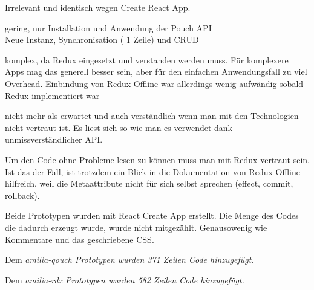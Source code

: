 
Irrelevant und identisch wegen Create React App.

%
\begin{description}[leftmargin=0.5cm,style=nextline]
  \item[amilia-qouch]
  gering, nur Installation und Anwendung der Pouch API\\
  Neue Instanz, Synchronisation ( 1 Zeile) und CRUD
  \item[amilia-rdx]
  komplex, da Redux eingesetzt und verstanden werden muss. Für komplexere Apps mag das generell besser sein, aber für den einfachen Anwendungsfall zu viel Overhead. Einbindung von Redux Offline war allerdings wenig aufwändig sobald Redux implementiert war
\end{description}
%
\begin{description}[leftmargin=0.5cm,style=nextline]
  \item[amilia-qouch]
  nicht mehr als erwartet und auch verständlich wenn man mit den Technologien nicht vertraut ist. Es liest sich so wie man es verwendet dank unmissverständlicher API.
  \item[amilia-rdx] 
  Um den Code ohne Probleme lesen zu können muss man mit Redux vertraut sein. Ist das der Fall, ist trotzdem ein Blick in die Dokumentation von Redux Offline hilfreich, weil die Metaattribute nicht für sich selbst sprechen (effect, commit, rollback).
\end{description}
%
  Beide Prototypen wurden mit React Create App erstellt. Die Menge des Codes die dadurch erzeugt wurde, wurde nicht mitgezählt. Genausowenig wie Kommentare und das geschriebene \gls{CSS}.
  \begin{description}[leftmargin=0.5cm,style=nextline]
    \item[amilia-qouch]
    Dem \it{amilia-qouch} Prototypen wurden 371 Zeilen Code hinzugefügt.
    \item[amilia-rdx] 
    Dem \it{amilia-rdx} Prototypen wurden 582 Zeilen Code hinzugefügt.
\end{description}
%
